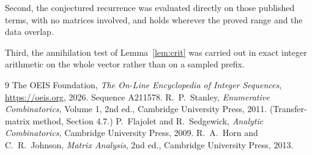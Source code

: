 \documentclass[11pt,a4paper]{article}
\theoremstyle{plain}
\theoremstyle{definition}
\begin{document}
Second, the conjectured recurrence was evaluated directly on those published terms, with no
matrices involved, and holds wherever the proved range and the data overlap.

Third, the annihilation test of Lemma~\ref{lem:crit} was carried out in exact integer
arithmetic on the whole vector rather than on a sampled prefix.

\begin{thebibliography}{9}
 The OEIS Foundation, \emph{The On-Line Encyclopedia of Integer
Sequences}, \url{https://oeis.org}, 2026. Sequence A211578.
 R.~P.~Stanley, \emph{Enumerative Combinatorics}, Volume 1, 2nd ed.,
Cambridge University Press, 2011. (Transfer-matrix method, Section 4.7.)
 P.~Flajolet and R.~Sedgewick, \emph{Analytic Combinatorics}, Cambridge
University Press, 2009.
 R.~A.~Horn and C.~R.~Johnson, \emph{Matrix Analysis}, 2nd ed., Cambridge
University Press, 2013.
\end{thebibliography}
\end{document}
